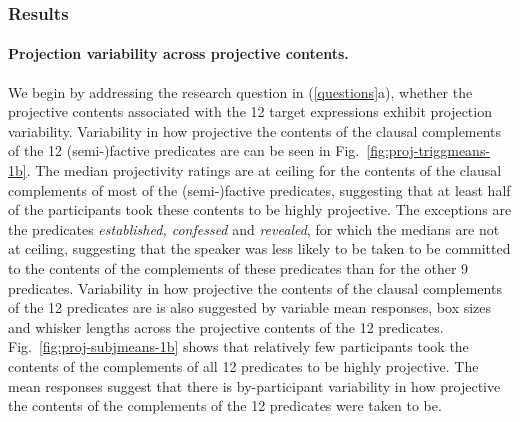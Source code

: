 \documentclass[11pt,fleqn]{article}
\newcommand{\6}{\mbox{$[\hspace*{-.6mm}[$}}
\newcommand{\9}{\mbox{$]\hspace*{-.6mm}]$}}
\newcommand{\figref}[1]{Fig.~\ref{#1}}
\begin{document}
\subsubsection{Results}

\paragraph{Projection variability across projective contents.} We begin by addressing the research question in (\ref{questions}a), whether the projective contents associated with the 12 target expressions exhibit projection variability. Variability in how projective the contents of the clausal complements of the 12 (semi-)factive predicates are can be seen in \figref{fig:proj-triggmeans-1b}. The median projectivity ratings are at ceiling for the contents of the clausal complements of most of the (semi-)factive predicates, suggesting that at least half of the participants took these contents to be highly projective. The exceptions are the predicates {\em established, confessed} and {\em revealed}, for which the medians are not at ceiling, suggesting that the speaker was less likely to be taken to be committed to the contents of the complements of these predicates than for the other 9 predicates. Variability in how projective the contents of the clausal complements of the 12 predicates are is also suggested by variable mean responses, box sizes and whisker lengths across the projective contents of the 12 predicates. \figref{fig:proj-subjmeans-1b} shows that relatively few participants took the contents of the complements of all 12 predicates to be highly projective. The mean responses suggest that there is by-participant variability in how projective the contents of the complements of the 12 predicates were taken to be.
\end{document}
